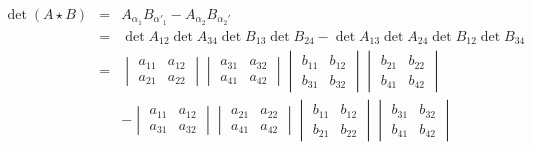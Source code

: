 \documentclass[10pt]{amsart}
\theoremstyle{definition}
\theoremstyle{remark}
\numberwithin{equation}{section}
\newcommand{\0}{\color{blue}{\mathsf{0}}}
\begin{document}
 \begin{eqnarray}  \det( A\star B)   & = & A_{\alpha_1} B_{\alpha'_1} - A_{\alpha_2} B_{\alpha_2'} \nonumber \\
 &=  &  \det A_{12} \det A_{34}  \det B_{13} \det B_{24} -  \det A_{13} \det A_{24}  \det B_{12} \det B_{34}     \nonumber \\ 
 &
 = & \begin{vmatrix} a_{11}& a_{12} \\ a_{21} & a_{22} \end{vmatrix}  \begin{vmatrix} a_{31}& a_{32} \\ a_{41} & a_{42} \end{vmatrix} 
  \begin{vmatrix} b_{11}& b_{12} \\ b_{31} & b_{32} \end{vmatrix}  \begin{vmatrix} b_{21}& b_{22} \\ b_{41} & b_{42} \end{vmatrix}    \nonumber\\
  &&   -   
     \begin{vmatrix} a_{11}& a_{12} \\ a_{31} & a_{32} \end{vmatrix}  \begin{vmatrix} a_{21}& a_{22} \\ a_{41} & a_{42} \end{vmatrix}  
    \begin{vmatrix} b_{11}& b_{12} \\ b_{21} & b_{22} \end{vmatrix}  \begin{vmatrix} b_{31}& b_{32} \\ b_{41} & b_{42} \end{vmatrix}  \nonumber
  \end{eqnarray} 
 
 
 
\end{document}
